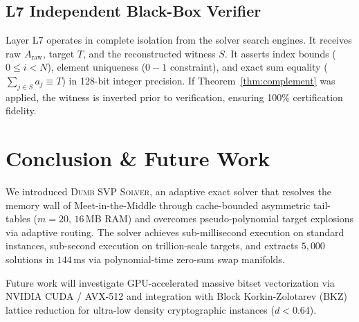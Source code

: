 \documentclass[journal,onecolumn,11pt]{IEEEtran}
\begin{document}
\subsection{L7 Independent Black-Box Verifier}
Layer L7 operates in complete isolation from the solver search engines. It receives raw $A_{\text{raw}}$, target $T$, and the reconstructed witness $S$. It asserts index bounds ($0 \le i < N$), element uniqueness ($0-1$ constraint), and exact sum equality ($\sum_{j \in S} a_j \equiv T$) in 128-bit integer precision. If Theorem~\ref{thm:complement} was applied, the witness is inverted prior to verification, ensuring 100\% certification fidelity.

\section{Conclusion \& Future Work}
\label{sec:conclusion}

We introduced \textsc{Dumb SVP Solver}, an adaptive exact solver that resolves the memory wall of Meet-in-the-Middle through cache-bounded asymmetric tail-tables ($m=20$, $16$\,MB RAM) and overcomes pseudo-polynomial target explosions via adaptive routing. The solver achieves sub-millisecond execution on standard instances, sub-second execution on trillion-scale targets, and extracts $5{,}000$ solutions in $144$\,ms via polynomial-time zero-sum swap manifolds.

Future work will investigate GPU-accelerated massive bitset vectorization via NVIDIA CUDA / AVX-512 and integration with Block Korkin-Zolotarev (BKZ) lattice reduction for ultra-low density cryptographic instances ($d < 0.64$).



\end{document}
